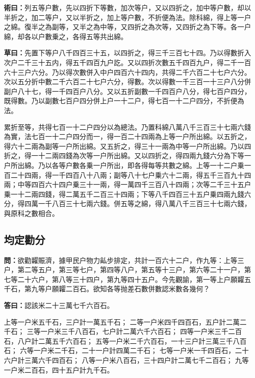 \documentclass[11pt,a4paper]{article}
\newcommand{\Question}[1]{\par\noindent\textbf{\color{problemcolor}問：}#1\par}
\newcommand{\Answer}[1]{\par\noindent\textbf{\color{answercolor}答曰：}#1\par}
\newcommand{\Method}[1]{\par\noindent\textbf{\color{methodcolor}術曰：}#1\par}
\newcommand{\Working}[1]{\par\noindent\textbf{草曰：}#1\par}
\begin{document}
\Method{列五等户數，先以四折下等數，加次等户，又以四折之，加中等户數，却以半折之，加二等户，又以半折之，加上等户數，不折便為法。除科綿，得上等一户之綿。復半之為副等，又半之為中等，又四折之為次等，又四折之為下等。各一户綿，却各以户數乗之，各得五等共出綿。}

\Working{先置下等户八千四百三十五，以四折之，得三千三百七十四。乃以得數折入次户二千三十五内，得五千四百九户訖。又以四折次數五千四百九户，得二千一百六十三户六分。乃以得次數併入中户四百六十四内，共得二千六百二十七户六分。次以五分折中數二千六百二十七户六分，得數。次以得數一千三百一十三户八分併副户八十七，得一千四百户八分。又以五折副數一千四百户八分，得七百户四分，既得數。乃以副數七百户四分併上户一十二户，得七百一十二户四分，不折便為法。

累折至等，共得七百一十二户四分以為總法。乃置科綿八萬八千三百三十七兩六錢為實，法七百一十二户四分而一，得一百二十四兩為上等一户所出綿。以五折之，得六十二兩為副等一户所出綿。又五折之，得三十一兩為中等一户所出綿。乃以四折之，得一十二兩四錢為次等一户所出綿。又以四折之，得四兩九錢六分為下等一户所出綿。乃以各等户數各乗一户所出，即各得每等共數之綿。上等一十二户乗一百二十四兩，得一千四百八十八兩；副等八十七户乗六十二兩，得五千三百九十四兩；中等四百六十四户乗三十一兩，得一萬四千三百八十四兩；次等二千三十五户乗一十二兩四錢，得二萬五千二百三十四兩；下等八千四百三十五户乗四兩九錢六分，得四萬一千八百三十七兩六錢。併五等之綿，得八萬八千三百三十七兩六錢，與原科之數相合。}

\subsection*{\color{sectioncolor}均定勸分}

\Question{欲勸糶賑濟，據甲民户物力畆步排定，共計一百六十二户，作九等：上等三户，第二等五户，第三等七户，第四等八户，第五等十三户，第六等二十一户，第七等二十六户，第八等三十四户，第九等四十五户。今先觀諭，第一等上户願糶五千石，第九等户願糶二百石。欲知各等抛差石數併數認米數各幾何？}

\Answer{認該米二十三萬七千六百石。

上等一户米五千石，三户計一萬五千石；
二等一户米四千四百石，五户計二萬二千石；
三等一户米三千八百石，七户計二萬六千六百石；
四等一户米三千二百石，八户計二萬五千六百石；
五等一户米二千六百石，一十三户計三萬三千八百石；
六等一户米二千石，二十一户計四萬二千石；
七等一户米一千四百石，二十六户計三萬六千四百石；
八等一户米八百石，三十四户計二萬七千二百石；
九等一户米二百石，四十五户計九千石。}
\end{document}
